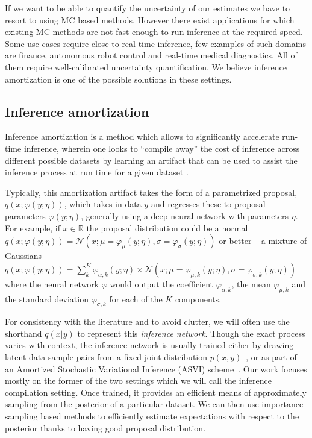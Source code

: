 \documentclass[12pt]{article}
\begin{document}
If we want to be able to quantify the uncertainty of our estimates we have to resort to using MC based methods.
However there exist applications for which existing MC methods are not fast enough to run inference at the required speed.
Some use-cases require close to real-time inference, few examples of such domains are finance, autonomous robot control and real-time medical diagnostics. 
All of them require well-calibrated uncertainty quantification.
We believe inference amortization is one of the possible solutions in these settings.



\subsection{Inference amortization}

Inference amortization is a method which allows to significantly accelerate run-time inference, wherein one looks to ``compile away'' the cost of inference
across different possible datasets
by learning an artifact that can be used to assist the inference process
at run time for a given dataset
\citep{StuhlmullerEtAl2013, VAE, ritchie2016deep, PaigeWood2016, LeEtAl2016, LeEtAl2017, FIVO, NaessethEtAl2017}.

Typically, this amortization
artifact takes the form of a parametrized proposal, $q(x ; \varphi(y; \eta))$, which takes
in data $y$ and regresses these to proposal parameters $\varphi(y; \eta)$, generally using
a deep neural network with parameters $\eta$.
For example, if $x \in \mathbb{R}$ 
the proposal distribution could be a normal 
$q(x ; \varphi(y; \eta)) = \mathcal{N}(x;\mu=\varphi_{\mu}(y; \eta),\sigma=\varphi_{\sigma}(y; \eta))$
or better -- a mixture of Gaussians
$q(x ; \varphi(y; \eta)) = \sum_k^K \varphi_{\alpha,k}(y; \eta) \times \mathcal{N}(x;\mu=\varphi_{\mu,k}(y; \eta),\sigma=\varphi_{\sigma,k}(y; \eta))$
where the neural network $\varphi$ would output 
the coefficient $\varphi_{\alpha,k}$,
the mean $\varphi_{\mu,k}$ and
the standard deviation $\varphi_{\sigma,k}$
for each of the $K$ components.

For consistency with the literature and to avoid clutter, we will often
use the shorthand $q(x|y)$ to represent this \emph{inference network}.
Though the exact process varies with context,
the inference network is usually trained either by drawing latent-data
sample pairs from a fixed joint distribution
$p(x,y)$~\citep{ritchie2016deep,PaigeWood2016,LeEtAl2016}, or 
as part of an Amortized Stochastic Variational Inference (ASVI) scheme~\citep{HoffmanEtAl2013,VAE,RezendeEtAl2014}.
Our work focuses mostly on the former of the two settings which we will call the inference compilation setting.
Once trained, it provides an efficient means of approximately
sampling from the posterior of a particular dataset.
We can then use importance sampling based methods to efficiently estimate expectations
with respect to the posterior thanks to having good proposal distribution.
\end{document}
